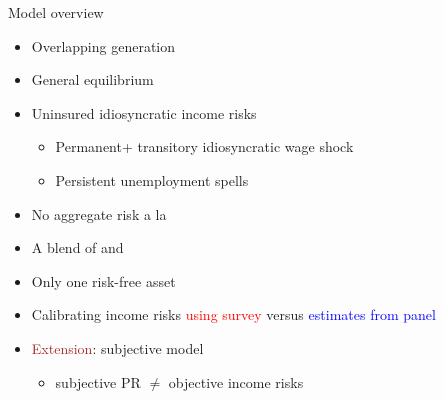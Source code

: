 \documentclass{beamer}
\begin{document}
\begin{frame}{Model overview}
	\begin{itemize}
		\item Overlapping generation 
		\item General equilibrium 

		\item Uninsured idiosyncratic income risks
		\begin{itemize}
		\item Permanent+ transitory idiosyncratic wage shock
		\item Persistent unemployment spells
		\end{itemize}
	\item No aggregate risk a la \cite{krusell1998income} 
		\item A blend of \cite{huggett1996wealth} and \cite{carroll1997buffer}
		\item Only one risk-free asset 
	\item Calibrating income risks \textcolor{red}{using survey} versus \textcolor{blue}{estimates from panel} 
	\item \textcolor{brown}{Extension}: subjective model
	\begin{itemize}
		\item subjective PR $\neq$ objective income risks 
	\end{itemize}

	\end{itemize}
\end{frame}
\end{document}
